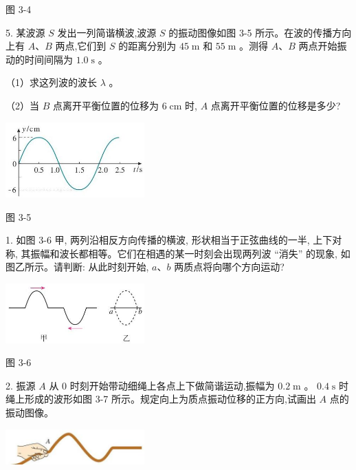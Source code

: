 \documentclass[10pt]{article}
\begin{document}
图 3-4

5. 某波源 \(S\) 发出一列简谐横波,波源 \(S\) 的振动图像如图 3-5 所示。在波的传播方向上有 \(A\text{、}B\) 两点,它们到 \(S\) 的距离分别为 \({45}\mathrm{\;m}\) 和 \({55}\mathrm{\;m}\) 。测得 \(A\text{、}B\) 两点开始振动的时间间隔为 \({1.0}\mathrm{\;s}\) 。

（1）求这列波的波长 \(\lambda\) 。

（2）当 \(B\) 点离开平衡位置的位移为 \(6\mathrm{\;{cm}}\) 时, \(A\) 点离开平衡位置的位移是多少?

\begin{center}
\includegraphics[max width=0.4\textwidth]{images/01910e4c-ebb8-7d2c-8f2f-2375bc1d2d12_87_357469.jpg}
\end{center}

图 3-5

1. 如图 3-6 甲, 两列沿相反方向传播的横波, 形状相当于正弦曲线的一半, 上下对称, 其振幅和波长都相等。它们在相遇的某一时刻会出现两列波 “消失” 的现象, 如图乙所示。请判断: 从此时刻开始, \(a\text{、}b\) 两质点将向哪个方向运动?

\begin{center}
\includegraphics[max width=0.4\textwidth]{images/01910e4c-ebb8-7d2c-8f2f-2375bc1d2d12_88_914921.jpg}
\end{center}

图 3-6

2. 振源 \(A\) 从 0 时刻开始带动细绳上各点上下做简谐运动,振幅为 \({0.2}\mathrm{\;m}\) 。 \({0.4}\mathrm{\;s}\) 时绳上形成的波形如图 3-7 所示。规定向上为质点振动位移的正方向,试画出 \(A\) 点的振动图像。

\begin{center}
\includegraphics[max width=0.4\textwidth]{images/01910e4c-ebb8-7d2c-8f2f-2375bc1d2d12_88_113757.jpg}
\end{center}
\end{document}

